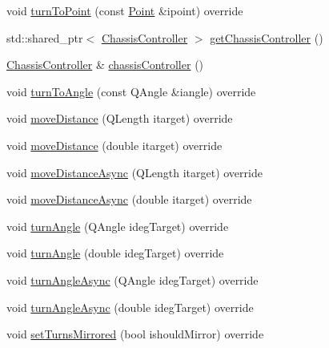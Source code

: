 \begin{DoxyCompactItemize}
\item 
void \mbox{\hyperlink{classokapi_1_1DefaultOdomChassisController_a6692219d4f4c264346c5c8096be41610}{turn\+To\+Point}} (const \mbox{\hyperlink{structokapi_1_1Point}{Point}} \&ipoint) override
\item 
std\+::shared\+\_\+ptr$<$ \mbox{\hyperlink{classokapi_1_1ChassisController}{Chassis\+Controller}} $>$ \mbox{\hyperlink{classokapi_1_1DefaultOdomChassisController_a2b5fc33c7fbe8d6fd49f4fd46fb84a2d}{get\+Chassis\+Controller}} ()
\item 
\mbox{\hyperlink{classokapi_1_1ChassisController}{Chassis\+Controller}} \& \mbox{\hyperlink{classokapi_1_1DefaultOdomChassisController_add1bed5d02d3da37306ef0016b7ad8a2}{chassis\+Controller}} ()
\item 
void \mbox{\hyperlink{classokapi_1_1DefaultOdomChassisController_aaf6e4d74384b87510d35b639e45f9dc2}{turn\+To\+Angle}} (const Q\+Angle \&iangle) override
\item 
void \mbox{\hyperlink{classokapi_1_1DefaultOdomChassisController_a3143bc60f72ab8ff8f63aad9a810a1c6}{move\+Distance}} (Q\+Length itarget) override
\item 
void \mbox{\hyperlink{classokapi_1_1DefaultOdomChassisController_a42abd53b9a0b96b722186ada8eb13d98}{move\+Distance}} (double itarget) override
\item 
void \mbox{\hyperlink{classokapi_1_1DefaultOdomChassisController_a61ca0d303fcbfd08932157af9adbbb12}{move\+Distance\+Async}} (Q\+Length itarget) override
\item 
void \mbox{\hyperlink{classokapi_1_1DefaultOdomChassisController_ab1abaec33ecce2515895d3a8af363c8c}{move\+Distance\+Async}} (double itarget) override
\item 
void \mbox{\hyperlink{classokapi_1_1DefaultOdomChassisController_a4ba07ac4bea9ff2d8aea30be72f6a0ea}{turn\+Angle}} (Q\+Angle ideg\+Target) override
\item 
void \mbox{\hyperlink{classokapi_1_1DefaultOdomChassisController_a05a8a6684b3afe4f7c2ecbc24699f70d}{turn\+Angle}} (double ideg\+Target) override
\item 
void \mbox{\hyperlink{classokapi_1_1DefaultOdomChassisController_a18d748097a7938e3102638d17be54c76}{turn\+Angle\+Async}} (Q\+Angle ideg\+Target) override
\item 
void \mbox{\hyperlink{classokapi_1_1DefaultOdomChassisController_a948978204fc6f2a2443025dfdb0241b1}{turn\+Angle\+Async}} (double ideg\+Target) override
\item 
void \mbox{\hyperlink{classokapi_1_1DefaultOdomChassisController_aed92ba0b7a9fc15bf645f3789e8598ae}{set\+Turns\+Mirrored}} (bool ishould\+Mirror) override

\end{DoxyCompactItemize}
